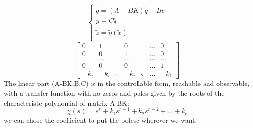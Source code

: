 \begin{equation*}
	\left\{
	\begin{array}{ll}	
		\dot{\tilde{q}}=(A-BK)\tilde{q}+Bv\\
		y=C\tilde{q}\\
		\dot{\tilde{z}}=\tilde{\eta}(\tilde{x})\\
	\end{array}
	\right.
\end{equation*}\[
\begin{bmatrix}
	0 & 1 & 0 & \dots & 0 \\
	0 & 0 & 1 & \dots & 0 \\
	\dots & \dots & \dots & \dots & \dots \\
	0 & 0 & 0 & \dots & 1 \\
	-k_r & -k_{r-1} & -k_{r-2} & \dots & -k_1
\end{bmatrix} 
\] The linear part (A-BK,B,C) is in the controllable form, reachable and observable, with a transfer function with no zeros and poles given by the roots of the characteristc polynomial of matrix A-BK: \[
\chi(s)=s^r+k_1s^{r-1} + k_2s^{r-2}+\dots+k_r
\] we can chose the coefficient to put the polese wherever we want.
